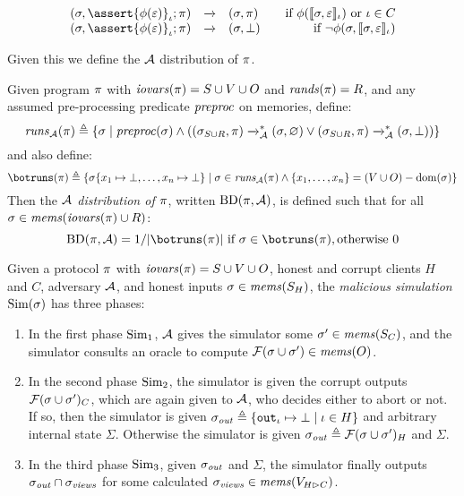 $$
\begin{array}{rcl@{\qquad}r}
  (\store,\elab{\assert{\phi(\be)}}{\cid};\prog) &\redx& (\store,\prog) & \text{if\ } \phi(\lcod{\store,\be}{\cid}) \text{\ or\ } \cid \in C\\
  (\store,\elab{\assert{\phi(\be)}}{\cid};\prog) &\redx& (\store,\bot)  & \text{if\ } \neg\phi(\store,\lcod{\store,\be}{\cid})
\end{array}
$$

Given this we define the $\mathcal{A}$ distribution of $\pi$. 
\begin{definition}
  \label{def-progd}
  \label{definition-progd}
  Given program $\pi$ with $\mathit{iovars}(\pi) = S \cup V \cup O$ and $\mathit{rands}(\pi) = R$, and
  any assumed pre-processing predicate $\mathit{preproc}$ on memories, define:
  $$
  \mathit{runs}_{\mathcal{A}}(\pi) \triangleq \{ \sigma \mid \mathit{preproc}(\sigma)  \wedge
  ((\sigma_{S\cup R},\pi) \xrightarrow{}_{\mathcal{A}}^* (\sigma,\varnothing) \vee (\sigma_{S \cup R},\pi) \xrightarrow{}_{\mathcal{A}}^* (\sigma,\bot)) \}
  $$
  and also define:
  $$
  \botruns(\prog) \defeq \{ \store\{ x_1 \mapsto \bot, \ldots, x_n \mapsto \bot \} \mid
  \store \in \aruns(\prog) \wedge \{ x_1,\ldots,x_n\} = (V \cup O) - \dom(\store) \}
  $$
  Then the \emph{$\mathcal{A}$ distribution of $\pi$}, written $\mathrm{BD}(\pi,\mathcal{A})$, is
  defined such that for all $\sigma \in \mathit{mems}(\mathit{iovars}(\pi) \cup R)$:
  $$
  \progtt(\prog,\adversary) =  1 / |\botruns(\prog)| \ \text{if}\ \store \in \botruns(\prog), \text{otherwise}\ 0
  $$
\end{definition}

\begin{definition}
  Given a protocol $\pi$ with $\mathit{iovars}(\pi) = S \cup V \cup O$, honest and corrupt 
  clients $H$ and $C$, adversary $\mathcal{A}$, and honest inputs
  $\sigma \in \mathit{mems}(S_H)$, the \emph{malicious simulation}  $\mathrm{Sim}(\sigma)$ has three phases:
  \begin{enumerate}
  \item In the first phase $\mathrm{Sim}_1$, $\mathcal{A}$ gives the
    simulator some $\sigma' \in \mathit{mems}(S_C)$, and the simulator consults an
    oracle to compute $\mathcal{F}(\sigma \cup \sigma') \in \mathit{mems}(O)$.
  \item In the second phase $\mathrm{Sim}_2$, the simulator is given the corrupt
    outputs $\mathcal{F}(\sigma \cup \sigma')_C$, which are again given to
    $\mathcal{A}$, who decides either to abort or not. If so, then the
    simulator is given $\sigma_{\mathit{out}} \triangleq \{ \texttt{out}_{\iota} \mapsto \bot \mid \iota \in H \}$
    and arbitrary internal state $\Sigma$.
    Otherwise the simulator is given $\sigma_{\mathit{out}} \triangleq \mathcal{F}(\sigma \cup \sigma')_H$
    and $\Sigma$.
  \item In the third phase $\mathrm{Sim}_3$, given $\sigma_{\mathit{out}}$ and $\Sigma$, the simulator
    finally outputs
    $\sigma_{\mathit{out}} \cap \sigma_{\mathit{views}}$ for some
    calculated $\sigma_{\mathit{views}} \in \mathit{mems}(V_{H \rhd C})$.
  \end{enumerate}
\end{definition}

